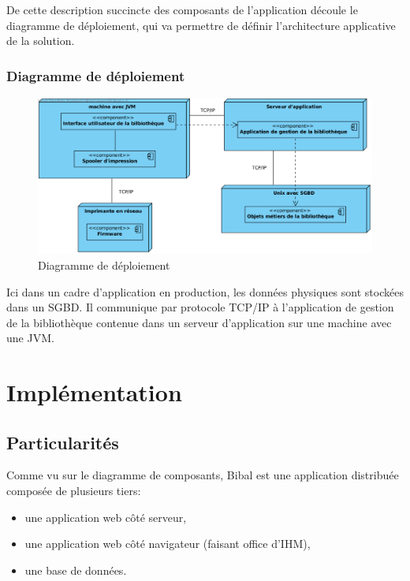 \documentclass[a4paper,12pt]{article}
\begin{document}
De cette description succincte des composants de l’application découle le
diagramme de déploiement, qui va permettre de définir l’architecture
applicative de la solution.


\subsubsection{Diagramme de déploiement}
\label{sec:orgheadline14}

\begin{figure}[htb]
\centering
\includegraphics[width=.9\linewidth]{./res/img/diagramme-de-deploiement.png}
\caption{\label{fig:orgparagraph7}
Diagramme de déploiement}
\end{figure}

Ici dans un cadre d’application en production, les données physiques sont
stockées dans un SGBD. Il communique par protocole TCP/IP à l’application de
gestion de la bibliothèque contenue dans un serveur d’application sur une
machine avec une JVM.

\section{Implémentation}
\label{sec:orgheadline20}
\subsection{Particularités}
\label{sec:orgheadline17}

Comme vu sur le diagramme de composants, Bibal est une application distribuée composée de plusieurs tiers:
\begin{itemize}
\item une application web côté serveur,
\item une application web côté navigateur (faisant office d'IHM),
\item une base de données.
\end{itemize}
\end{document}
